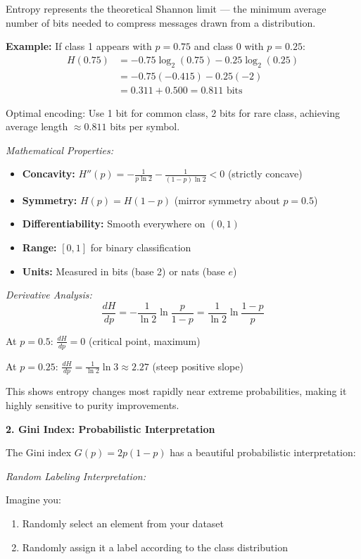 \documentclass[12pt]{article}
\begin{document}
\begin{explanation}
Entropy represents the theoretical Shannon limit — the minimum average number of bits needed to compress messages drawn from a distribution.

\textbf{Example:} If class 1 appears with $p=0.75$ and class 0 with $p=0.25$:
\begin{align*}
H(0.75) &= -0.75\log_2(0.75) - 0.25\log_2(0.25) \\
&= -0.75(-0.415) - 0.25(-2) \\
&= 0.311 + 0.500 = 0.811 \text{ bits}
\end{align*}

Optimal encoding: Use 1 bit for common class, 2 bits for rare class, achieving average length $\approx 0.811$ bits per symbol.

\textit{Mathematical Properties:}
\begin{itemize}
    \item \textbf{Concavity:} $H''(p) = -\frac{1}{p\ln 2} - \frac{1}{(1-p)\ln 2} < 0$ (strictly concave)
    \item \textbf{Symmetry:} $H(p) = H(1-p)$ (mirror symmetry about $p=0.5$)
    \item \textbf{Differentiability:} Smooth everywhere on $(0,1)$
    \item \textbf{Range:} $[0,1]$ for binary classification
    \item \textbf{Units:} Measured in bits (base 2) or nats (base $e$)
\end{itemize}

\textit{Derivative Analysis:}
\[
\frac{dH}{dp} = -\frac{1}{\ln 2}\ln\frac{p}{1-p} = \frac{1}{\ln 2}\ln\frac{1-p}{p}
\]

At $p=0.5$: $\frac{dH}{dp} = 0$ (critical point, maximum)

At $p=0.25$: $\frac{dH}{dp} = \frac{1}{\ln 2}\ln 3 \approx 2.27$ (steep positive slope)

This shows entropy changes most rapidly near extreme probabilities, making it highly sensitive to purity improvements.

\textbf{2. Gini Index: Probabilistic Interpretation}

The Gini index $G(p) = 2p(1-p)$ has a beautiful probabilistic interpretation:

\textit{Random Labeling Interpretation:}

Imagine you:
\begin{enumerate}
    \item Randomly select an element from your dataset
    \item Randomly assign it a label according to the class distribution
\end{enumerate}


\end{explanation}
\end{document}
